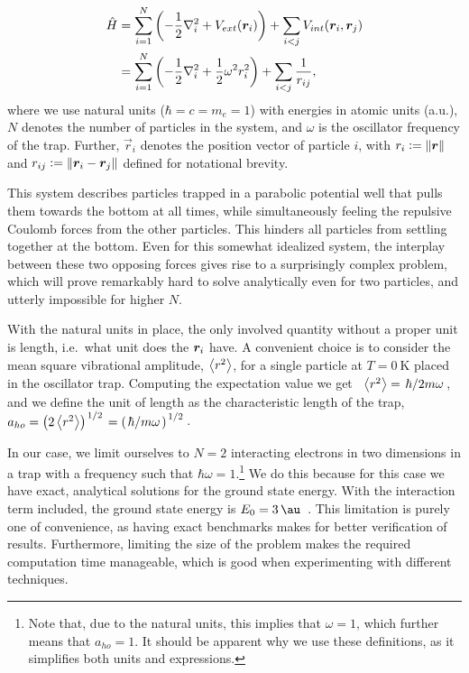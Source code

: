 \documentclass[Thesis.tex]{subfiles}
\begin{document}
\begin{align}
    \begin{split}
        \hat H &= \sum_{i=1}^N\qty(-\frac{1}{2}\laplacian_i + V_{ext}(\vec r_i)) +
        \sum_{i < j} V_{int}(\vec r_i, \vec r_j)\\
        &= \sum_{i=1}^N\qty(-\frac{1}{2}\laplacian_i + \frac{1}{2}\omega^2
        r_i^2) + \sum_{i < j} \frac{1}{r_{ij}},
    \end{split}\label{eq:H-QD-def}
\end{align}
where we use natural units ($\hbar=c=m_e=1$) with energies in
atomic units (a.u.), $N$ denotes the number of particles in the system, and
$\omega$ is the oscillator frequency of the trap. Further, $\vec r_i$
denotes the position vector of particle $i$, with $r_i \vcentcolon= \norm{\bm{r}}$ and
$r_{ij}\vcentcolon= \norm{\bm{r}_i - \bm{r}_j}$ defined for notational brevity.

This system describes particles trapped in a parabolic potential well that pulls
them towards the bottom at all times, while simultaneously feeling the repulsive
Coulomb forces from the other particles. This hinders all particles from settling together
at the bottom. Even for this somewhat idealized system, the interplay between these two
opposing forces gives rise to a surprisingly complex problem, which will prove remarkably
hard to solve analytically even for two particles, and utterly impossible for higher $N$.

With the natural units in place, the only involved quantity without a proper
unit is length, i.e.\ what unit does the $\bm{r}_i$ have. A convenient
choice is to consider the mean square vibrational amplitude, $\expval{r^2}$, for
a single particle at $T = \SI{0}{\kelvin}$ placed in the oscillator trap.
Computing the expectation value we get~\cite{citation-needed}
$\expval{r^2}=\flatfrac{\hbar}{2m\omega}$, and we define the unit of length as the
characteristic length of the trap, $a_{ho}=\qty(2\expval{r^2})^{\flatfrac{1}{2}}=\qty(\flatfrac{\hbar}{m\omega})^{\flatfrac{1}{2}}$.

In our case, we limit ourselves to $N=2$ interacting electrons in two
dimensions in a trap with a frequency such that $\hbar \omega =
1$.\footnote{Note that, due to the natural units, this implies that $\omega =
  1$, which further means that $a_{ho} = 1$. It should be apparent why we use these
  definitions, as it simplifies both units and expressions.} We do this because for
this case we have exact, analytical solutions for the ground state energy. With the
interaction term included, the ground state energy is $E_0 = \SI{3}{\au}$~\cite{Taut1993}.
This limitation is purely one of convenience, as having exact benchmarks makes for better
verification of results. Furthermore, limiting the size of the problem makes the required
computation time manageable, which is good when experimenting with different techniques.
\end{document}
